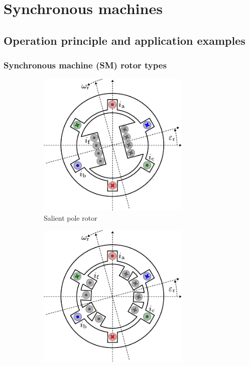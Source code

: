 \section{Synchronous machines}

\subsection{Operation principle and application examples}

\begin{frame}
	\frametitle{Synchronous machine (SM) rotor types}
	\begin{figure}
		\centering
		\begin{subfigure}{0.49\textwidth}
			\centering
			\includegraphics[width=0.8\textwidth]{fig/lec07/SM_salient_pole.pdf}
			\caption{Salient pole rotor}
		\end{subfigure}
		\hfill
		\begin{subfigure}{0.49\textwidth}
			\centering
			\includegraphics[width=0.8\textwidth]{fig/lec07/SM_cylindrical_rotor.pdf}

\end{subfigure}
\end{figure}
\end{frame}
